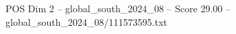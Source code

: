 \begin{textsample}{POS Dim 2 – global\_south\_2024\_08 – Score 29.00 – global\_south\_2024\_08/111573595.txt}
\end{textsample}
